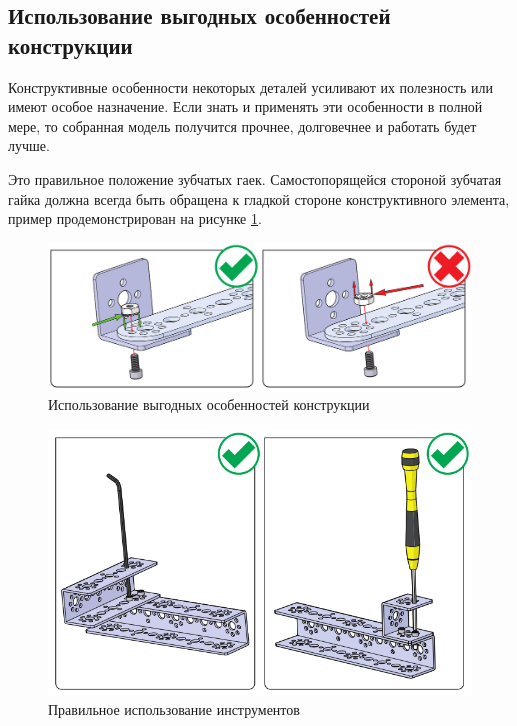 \subsection{Использование выгодных особенностей конструкции}
Конструктивные особенности некоторых деталей усиливают их полезность или имеют особое назначение. Если знать и применять
эти особенности в полной мере, то собранная модель получится прочнее, долговечнее и работать будет лучше.\cite{2}

Это правильное положение зубчатых гаек. Самостопорящейся стороной зубчатая гайка должна всегда быть обращена к гладкой
стороне конструктивного элемента, пример продемонстрирован на рисунке \ref{fig:const}.

\begin{figure}[h]
    \centering
    \includegraphics[scale=0.3]{fig/2.4.png}
    \caption{Использование выгодных особенностей конструкции}
    \label{fig:const}
\end{figure}

\begin{figure}[h]
    \centering
    \includegraphics[scale=0.5]{fig/2.3.png}
    \caption{Правильное использование инструментов}
    \label{fig:inst}
\end{figure}

